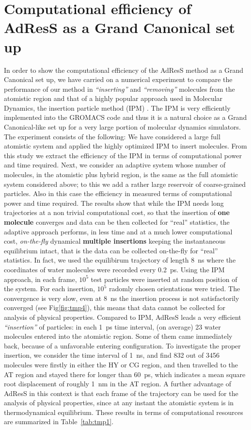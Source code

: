\documentclass[aip,jcp,a4paper,reprint,onecolumn]{revtex4-1}
\newcommand{\redc}[1]{{\color{red} #1}}
\newcommand{\bluec}[1]{{\color{blue} #1}}
\begin{document}
\section{Computational efficiency of AdResS as a Grand Canonical set up}
\redc{In order to show the computational efficiency of the AdResS method as a Grand Canonical set up, we have carried on a numerical experiment to compare the performance of our method in {\it ``inserting''} and {\it ``removing''} molecules from the atomistic region and that of a highly popular approach used in Molecular Dynamics, the insertion particle method (IPM) \cite{ipm}. The IPM is very efficiently implemented into the GROMACS code \cite{gromacs} and thus it is a natural choice as a Grand Canonical-like set up for a very large portion of molecular dynamics simulators. The experiment consists of the following: We have considered a large full atomistic system and applied the highly optimized IPM to insert molecules. From this study we extract the efficiency of the IPM in terms of computational power and time required.
Next, we consider an adaptive system whose number of molecules, in the atomistic plus hybrid region, is the same as the full atomistic system considered above; to this we add a rather large reservoir of coarse-grained particles. Also in this case the efficiency in measured terms of computational power and time required.
The results show that while the IPM needs long trajectories at a non trivial computational cost, so that the insertion of {\bf one molecule} converges and data can be then collected for ``real'' statistics, the adaptive approach performs, in less time and at a much lower computational cost, {\it on-the-fly} dynamical {\bf multiple insertions} keeping the instantaneous equilibrium intact, that is the data can be collected on-the-fly for ``real'' statistics.
 In fact, we used the equilibirum trajectory of length
8~\textsf{ns} where the coordinates of water molecules were recorded every
0.2~\textsf{ps}.  Using the IPM approach, in each frame, $10^5$ test particles were inserted
at random position of the system. For each insertion, $10^5$ radomly
chosen orientations were tried. The convergence is very
slow, even at 8~\textsf{ns} the insertion process is not satisfactorily converged (see Fig\ref{fig:tmp4}), this means that data cannot be collected for analysis of physical properties.
Compared to IPM, AdResS leads a very
efficient {\it ``insertion''} of particles: in each 1~\textsf{ps} time interval,
(on average) \bluec{23} water molecules entered into the atomistic region. Some of
them came immediately back, because of a unfavorable entering
configuration.  To investigate the proper insertion, we consider the
time interval of 1~\textsf{ns}, and find 832 out of 3456 molecules
were firstly in either the HY or CG region, and then travelled to the
AT region and stayed there for longer than 60~\textsf{ps}, which
indicates a mean square root displacement of roughly 1~\textsf{nm}
in the AT region. A further advantage of AdResS in this context is that each frame of the trajectory can be used for the  analysis of physical properties, since at any instant the atomistic system is in thermodynamical equilibrium. 
These results in terms of computational resources are summarized in Table~\ref{tab:tmp1}.}
\end{document}
